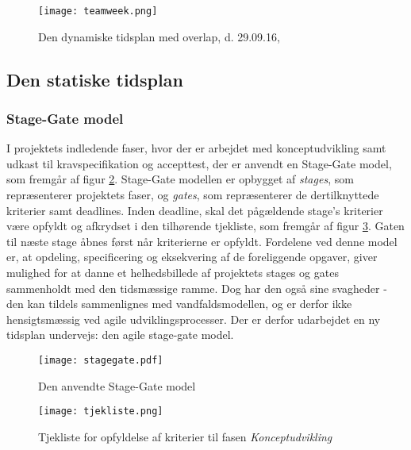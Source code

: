 \begin{figure}
\centering
\texttt{[image: teamweek.png]}	
\caption{Den dynamiske tidsplan med overlap, d. 29.09.16,}
\label{fig:teamweek}
\end{figure}

\subsection{Den statiske tidsplan}
\subsubsection{Stage-Gate model}
I projektets indledende faser, hvor der er arbejdet med konceptudvikling samt udkast til kravspecifikation og accepttest, der er anvendt en Stage-Gate model, som fremgår af figur \ref{fig:stagegate}. Stage-Gate modellen er opbygget af \textit{stages}, som repræsenterer projektets faser, og \textit{gates}, som repræsenterer de dertilknyttede kriterier samt deadlines. Inden deadline, skal det pågældende stage's kriterier være opfyldt og afkrydset i den tilhørende tjekliste, som fremgår af figur \ref{fig:tjekliste}. Gaten til næste stage åbnes først når kriterierne er opfyldt. Fordelene ved denne model er, at opdeling, specificering og eksekvering af de foreliggende opgaver, giver mulighed for at danne et helhedsbillede af projektets stages og gates sammenholdt med den tidsmæssige ramme. Dog har den også sine svagheder - den kan tildels sammenlignes med vandfaldsmodellen, og er derfor ikke hensigtsmæssig ved agile udviklingsprocesser. Der er derfor udarbejdet en ny tidsplan undervejs: den agile stage-gate model. 

\newpage
\begin{landscape}
\begin{figure}
\centering	
\texttt{[image: stagegate.pdf]}
\caption{Den anvendte Stage-Gate model}
\label{fig:stagegate}
\end{figure}
\end{landscape}

\begin{figure}
\centering
\texttt{[image: tjekliste.png]}
\caption{Tjekliste for opfyldelse af kriterier til fasen \textit{Konceptudvikling}}
\label{fig:tjekliste}
\end{figure}

